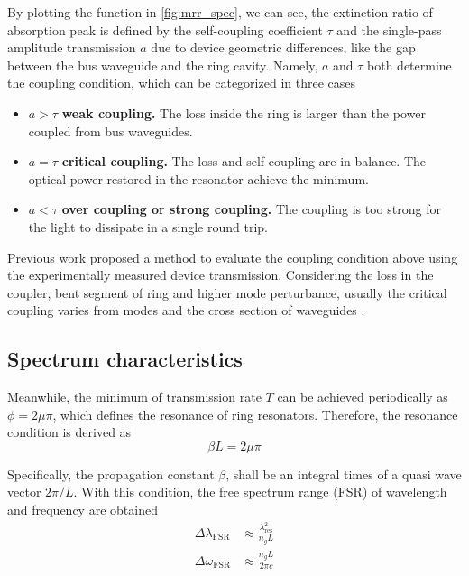 \documentclass[final]{kuee_en}
\begin{document}
By plotting the function in \autoref{fig:mrr_spec}, we can see, the extinction ratio of absorption peak is defined by the self-coupling coefficient $\tau$ and the single-pass amplitude transmission $a$ due to device geometric differences, like the gap between the bus waveguide and the ring cavity. Namely, $a$ and $\tau$ both determine the coupling condition, which can be categorized in three cases
\begin{itemize}
    \item $a>\tau$ \textbf{weak coupling.} The loss inside the ring is larger than the power coupled from bus waveguides.
    \item $a=\tau$ \textbf{critical coupling.} The loss and self-coupling are in balance. The optical power restored in the resonator achieve the minimum.
    \item $a<\tau$ \textbf{over coupling or strong coupling.} The coupling is too strong for the light to dissipate in a single round trip.
\end{itemize}

Previous work \cite{Yusuke2017} proposed a method to evaluate the coupling condition above using the experimentally measured device transmission. Considering the loss in the coupler, bent segment of ring and higher mode perturbance, usually the critical coupling varies from modes and the cross section of waveguides \cite{Pfeiffer2017}.

\subsection{Spectrum characteristics}
Meanwhile, the minimum of transmission rate $T$ can be achieved periodically as $\phi=2 \mu \pi$, which defines the resonance of ring resonators. Therefore, the resonance condition is derived as
\begin{equation}
    \beta L =2 \mu \pi
\end{equation}
    
Specifically, the propagation constant $\beta$, shall be an integral times of a quasi wave vector $2\pi/L$. With this condition, the free spectrum range (FSR) of wavelength and frequency are obtained
\begin{align}
    \Delta \lambda_\mathrm{FSR} &\approx \frac{\lambda_\mathrm{res}^2}{n_g L} \label{eq:fsr-wl} \\
    \Delta \omega_\mathrm{FSR} &\approx \frac{n_g L}{2\pi c} \label{eq:fsr-w}
\end{align}
\end{document}

